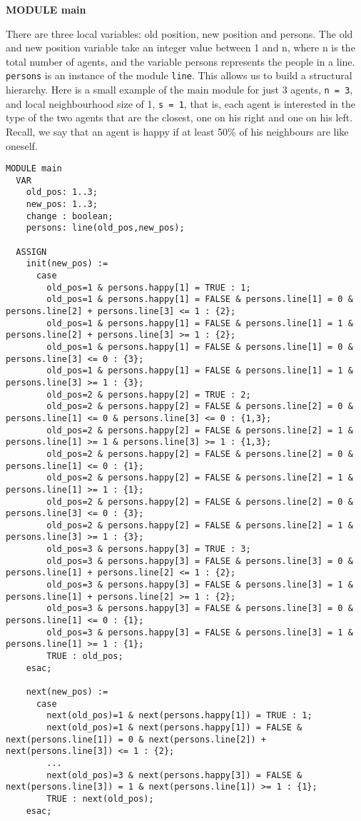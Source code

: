\documentclass[../main.tex]{subfiles}
\begin{document}
\textbf{MODULE main} 

 There are three local variables: old position, new position and persons. The old and new position variable take an integer value between 1 and n, where n is the total number of agents, and the variable persons represents the people in a line. \verb|persons| is an instance of the module \verb|line|. This allows us to build a structural hierarchy. Here is a small example of the main module for just 3 agents, \verb|n = 3|, and local neighbourhood size of 1, \verb|s = 1|, that is, each agent is interested in the type of the two agents that are the closest, one on his right and one on his left. Recall, we say that an agent is happy if at least 50\% of his neighbours are like oneself.
\begin{lstlisting}
MODULE main
  VAR
    old_pos: 1..3;
    new_pos: 1..3;
    change : boolean; 
    persons: line(old_pos,new_pos);

  ASSIGN
    init(new_pos) :=
      case
        old_pos=1 & persons.happy[1] = TRUE : 1;
        old_pos=1 & persons.happy[1] = FALSE & persons.line[1] = 0 &  persons.line[2] + persons.line[3] <= 1 : {2};
        old_pos=1 & persons.happy[1] = FALSE & persons.line[1] = 1 &  persons.line[2] + persons.line[3] >= 1 : {2};
        old_pos=1 & persons.happy[1] = FALSE & persons.line[1] = 0 & persons.line[3] <= 0 : {3};
        old_pos=1 & persons.happy[1] = FALSE & persons.line[1] = 1 & persons.line[3] >= 1 : {3};
        old_pos=2 & persons.happy[2] = TRUE : 2;
        old_pos=2 & persons.happy[2] = FALSE & persons.line[2] = 0 & persons.line[1] <= 0 & persons.line[3] <= 0 : {1,3};
        old_pos=2 & persons.happy[2] = FALSE & persons.line[2] = 1 & persons.line[1] >= 1 & persons.line[3] >= 1 : {1,3};
        old_pos=2 & persons.happy[2] = FALSE & persons.line[2] = 0 & persons.line[1] <= 0 : {1};
        old_pos=2 & persons.happy[2] = FALSE & persons.line[2] = 1 & persons.line[1] >= 1 : {1};
        old_pos=2 & persons.happy[2] = FALSE & persons.line[2] = 0 & persons.line[3] <= 0 : {3};
        old_pos=2 & persons.happy[2] = FALSE & persons.line[2] = 1 &  persons.line[3] >= 1 : {3};
        old_pos=3 & persons.happy[3] = TRUE : 3;
        old_pos=3 & persons.happy[3] = FALSE & persons.line[3] = 0 & persons.line[1] + persons.line[2] <= 1 : {2};
        old_pos=3 & persons.happy[3] = FALSE & persons.line[3] = 1 & persons.line[1] + persons.line[2] >= 1 : {2};
        old_pos=3 & persons.happy[3] = FALSE & persons.line[3] = 0 & persons.line[1] <= 0 : {1};
        old_pos=3 & persons.happy[3] = FALSE & persons.line[3] = 1 & persons.line[1] >= 1 : {1};
        TRUE : old_pos;
    esac;

    next(new_pos) :=
      case
        next(old_pos)=1 & next(persons.happy[1]) = TRUE : 1;
        next(old_pos)=1 & next(persons.happy[1]) = FALSE & next(persons.line[1]) = 0 & next(persons.line[2]) + next(persons.line[3]) <= 1 : {2};
        ...
        next(old_pos)=3 & next(persons.happy[3]) = FALSE & next(persons.line[3]) = 1 & next(persons.line[1]) >= 1 : {1};
        TRUE : next(old_pos);
    esac;
      
\end{lstlisting}
\end{document}
